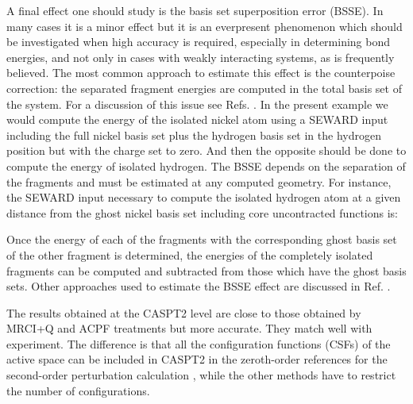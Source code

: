 
A final effect one should study is the basis set superposition error (BSSE).
In many cases it is a minor effect but it is an everpresent phenomenon
which should be investigated when high accuracy is required, especially in
determining bond energies, and not only in cases with weakly interacting
systems, as is frequently believed. The most common approach to estimate
this effect is the counterpoise correction: the separated fragment energies
are computed in the total basis set of the system. For a discussion of this
issue see Refs. \cite{Taylor:92b,Gonzalez:94}. In the present example
we would compute the energy of the isolated nickel atom using a SEWARD input
including the full nickel basis set plus the hydrogen basis set in the 
hydrogen position but with the charge set to zero. And then the opposite
should be done to compute the energy of isolated hydrogen. The BSSE depends
on the separation of the fragments and must be
estimated at any computed geometry. For instance, the SEWARD input necessary
to compute the isolated hydrogen atom at a given distance from the ghost
nickel basis set including core uncontracted functions is:



Once the energy of each of the fragments with the corresponding ghost
basis set of the other fragment is determined, the energies of the
completely isolated fragments can be computed and subtracted from those
which have the ghost basis sets. Other approaches used to estimate
the BSSE effect are discussed in Ref. \cite{Taylor:92b}.

The results obtained at the CASPT2 level are close to those obtained by
MRCI+Q and ACPF treatments but more accurate. They match well with experiment.
The difference is that all the configuration functions (CSFs) of the active
space can be included in CASPT2 in the zeroth-order references for the second-order
perturbation calculation \cite{Pou:94}, while the other methods have to restrict
the number of configurations.

